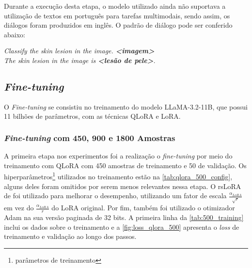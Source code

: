 Durante a execução desta etapa, o modelo utilizado ainda não suportava a utilização de textos em português para tarefas
multimodais, sendo assim, os diálogos foram produzidos em inglês. O padrão de diálogo pode ser conferido abaixo:

\begin{dialogue}
     \textit{Classify the skin lesion in the image. \textbf{<imagem>}} \\
     \textit{The skin lesion in the image is \textbf{<lesão de pele>}.}
\end{dialogue}

\subsection{\textit{Fine-tuning}}

O \textit{Fine-tuning} se consistiu no treinamento do modelo \ac{LLaMA}-3.2-11B, que possui 11 bilhões de parâmetros,
com as técnicas \ac{QLoRA} e \ac{LoRA}.

\subsubsection{\textit{Fine-tuning} com 450, 900 e 1800 Amostras}

A primeira etapa nos experimentos foi a realização o \textit{fine-tuning} por meio do treinamento com \ac{QLoRA} com
450 amostras de treinamento e 50 de validação. Os hiperparâmetros\footnote{parâmetros de treinamento} utilizados no
treinamento estão na \autoref{tab:qlora_500_config}, alguns deles foram omitidos por serem menos relevantes nessa
etapa. O \ac{rsLoRA} de \textcite{kalajdzievski2023rank} foi utilizado para melhorar o desempenho, utilizando um fator
de escala \begin{math}\frac{\alpha_{LoRA}}{\sqrt{r}}\end{math} em vez do \begin{math}\frac{\alpha_{LoRA}}{r}\end{math}
do \ac{LoRA} original. Por fim, também foi utilizado o otimizador \ac{Adam} na sua versão paginada de 32 bits. A
primeira linha da \autoref{tab:500_training} inclui os dados sobre o treinamento e a \autoref{fig:loss_qlora_500}
apresenta o \textit{loss} de treinamento e validação ao longo dos passos.

